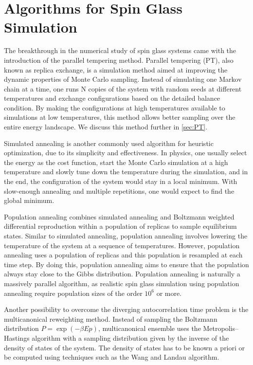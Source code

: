 \section{Algorithms for Spin Glass Simulation}
The breakthrough in the numerical study of spin glass systems came with the 
introduction of the parallel tempering method\cite{Swendsen-Wang-1986,Hukushima-Nemoto1996,Marinari-Parisi1992}. 
Parallel tempering (PT), also known
as replica exchange, is a simulation method aimed at improving the dynamic 
properties of Monte Carlo sampling. Instead of simulating one Markov chain at 
a time, one runs N copies of the system with random seeds at different 
temperatures and exchange configurations based on the detailed balance condition.
By making the configurations at high temperatures available to simulations at 
low temperatures, this method allows better sampling over the entire energy
landscape. We discuss this method further in \ref{sec:PT}.

Simulated annealing\citep{1983Sci...220..671K} is another commonly used algorithm for heuristic optimization,
due to its simplicity and effectiveness. In physics, one usually select the 
energy as the cost function, start the Monte Carlo simulation at a high temperature
and slowly tune down the temperature during the simulation, and in the end, the
configuration of the system would stay in a local minimum. With slow-enough annealing
and multiple repetitions, one would expect to find the global minimum.  

Population annealing\citep{2015PhRvE..92f3307W} combines simulated annealing and Boltzmann weighted 
differential reproduction within a population of replicas to sample equilibrium 
states. Similar to simulated annealing, population annealing involves lowering 
the temperature of the system at a sequence of temperatures. However, population annealing uses a 
population of replicas and this population is resampled at each time step.
By doing this, population annealing aims to ensure that the population always stay close to the 
Gibbs distribution. Population annealing is naturally a massively
parallel algorithm, as realistic spin glass simulation using population 
annealing require population sizes of the order $10^6$ or more.

Another possibility to overcome the diverging autocorrelation time problem is the 
multicanonical reweighting method\citep{1998PhyA..254..164J}. Instead of sampling the Boltzmann 
distribution $P=\exp(-\beta Ep)$, multicanonical ensemble uses the 
Metropolis–Hastings algorithm with a sampling distribution given by the inverse 
of the density of states of the system. The density of states has to be known 
a priori or be computed using techniques such as the Wang and Landau algorithm.




